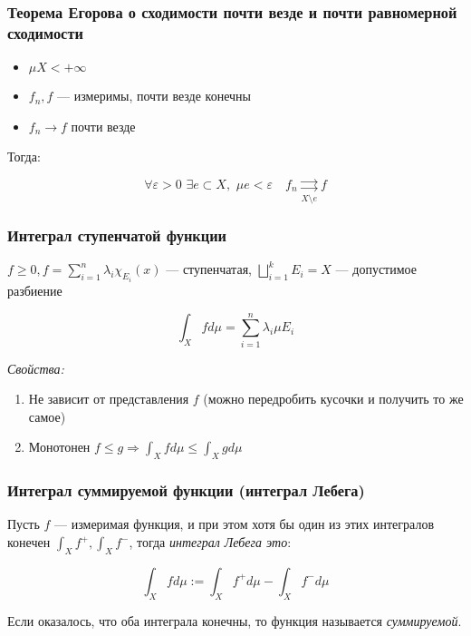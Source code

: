 \documentclass{article}
\def\dbl{\,\,}
\def\rsh#1{\underset{#1}{\rightrightarrows}}
\begin{document}
\subsubsection{Теорема Егорова о сходимости почти везде и почти равномерной сходимости}

\begin{itemize}
    \item $\mu X < + \infty$
    \item $f_n, f$ --- измеримы, почти везде конечны
    \item $f_n \rightarrow f$ почти везде
\end{itemize}

Тогда:

\[\forall \varepsilon > 0 \dbl \exists e \subset X, \dbl \mu e < \varepsilon \quad f_n \rsh{X \setminus e} f\]

\subsubsection{Интеграл ступенчатой функции}

$f \ge 0, f = \sum_{i = 1}^{n} \lambda_i \chi_{E_i}(x)$ --- ступенчатая, $\bigsqcup_{i = 1}^{k} E_{i} = X$ --- допустимое разбиение

\[\int_{X} f d \mu = \sum_{i = 1}^{n} \lambda_i \mu E_i \] 

\textit{Свойства: }

\begin{enumerate}
    \item Не зависит от представления $f$ (можно передробить кусочки и получить то же самое)
    \item Монотонен $f \le g \Rightarrow \int_{X} f d \mu \le \int_{X} g d \mu$
\end{enumerate}


\subsubsection{Интеграл суммируемой функции (интеграл Лебега)}

Пусть $f$ --- измеримая функция, и при этом хотя бы один из этих интегралов конечен $\int_{X} f^{+}, \int_{X} f^{-}$, тогда \textit{интеграл Лебега это}:

\[\int_{X} f d \mu := \int_{X} f^{+} d \mu - \int_{X} f^{-} d \mu\]

Если оказалось, что оба интеграла конечны, то функция называется \textit{суммируемой}.
\end{document}
